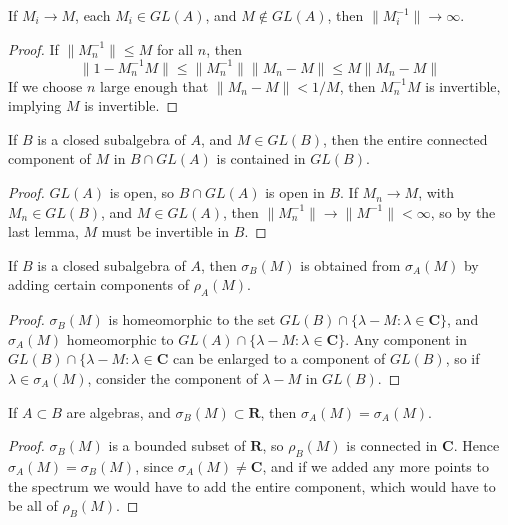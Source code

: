 \begin{lemma}
    If $M_i \to M$, each $M_i \in GL(A)$, and $M \not \in GL(A)$, then $\| M_i^{-1} \| \to \infty$.
\end{lemma}
\begin{proof}
    If $\| M_n^{-1} \| \leq M$ for all $n$, then
    \[ \| 1 - M_n^{-1} M \| \leq \| M_n^{-1} \| \| M_n - M \| \leq M \| M_n - M \| \]
    If we choose $n$ large enough that $\| M_n - M \| < 1/M$, then $M_n^{-1} M$ is invertible, implying $M$ is invertible.
\end{proof}

\begin{theorem}
    If $B$ is a closed subalgebra of $A$, and $M \in GL(B)$, then the entire connected component of $M$ in $B \cap GL(A)$ is contained in $GL(B)$.
\end{theorem}
\begin{proof}
    $GL(A)$ is open, so $B \cap GL(A)$ is open in $B$. If $M_n \to M$, with $M_n \in GL(B)$, and $M \in GL(A)$, then $\| M_n^{-1} \| \to \| M^{-1} \| < \infty$, so by the last lemma, $M$ must be invertible in $B$.
\end{proof}

\begin{corollary}
    If $B$ is a closed subalgebra of $A$, then $\sigma_B(M)$ is obtained from $\sigma_A(M)$ by adding certain components of $\rho_A(M)$.
\end{corollary}
\begin{proof}
    $\sigma_B(M)$ is homeomorphic to the set $GL(B) \cap \{ \lambda - M : \lambda \in \mathbf{C} \}$, and $\sigma_A(M)$ homeomorphic to $GL(A) \cap \{ \lambda - M : \lambda \in \mathbf{C} \}$. Any component in $GL(B) \cap \{ \lambda - M : \lambda \in \mathbf{C}$ can be enlarged to a component of $GL(B)$, so if $\lambda \in \sigma_A(M)$, consider the component of $\lambda - M$ in $GL(B)$.
\end{proof}

\begin{corollary}
    If $A \subset B$ are algebras, and $\sigma_B(M) \subset \mathbf{R}$, then $\sigma_A(M) = \sigma_A(M)$.
\end{corollary}
\begin{proof}
    $\sigma_B(M)$ is a bounded subset of $\mathbf{R}$, so $\rho_B(M)$ is connected in $\mathbf{C}$. Hence $\sigma_A(M) = \sigma_B(M)$, since $\sigma_A(M) \neq \mathbf{C}$, and if we added any more points to the spectrum we would have to add the entire component, which would have to be all of $\rho_B(M)$.
\end{proof}

